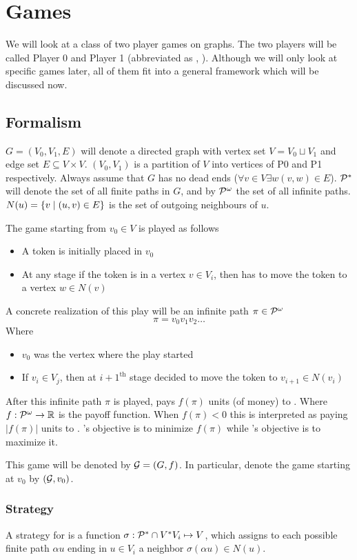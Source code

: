 \chapter{Games}
We will look at a class of two player games on graphs. The two players will be called Player 0 and Player 1 (abbreviated as , ). Although we will only look at specific games later, all of them fit into a general framework which will be discussed now.
\section{Formalism}
\label{sec:formalism}
$G=(V_0,V_1,E)$ will denote a directed graph with vertex set $V=V_0 \sqcup V_1$ and edge set $E \subseteq V\times V$. $(V_0,V_1)$ is a partition of $V$ into vertices of P0 and P1 respectively. Always assume that $G$ has no dead ends ($\forall v \in V \exists w  (v,w) \in E$). $\mathcal{P}^{*}$ will denote the set of all finite paths in $G$, and by $\mathcal{P}^\omega$ the set of all infinite paths. $N(u)=\left\{v \mid (u,v) \in E\right\}$ is the set of outgoing neighbours of $u$.

The game starting from $v_0 \in V$ is played as follows
\begin{itemize}
  \item A token is initially placed in $v_0$
  \item At any stage if the token is in a vertex $v \in V_i$, then  has to move the token to a vertex $w \in N(v)$
\end{itemize}
A concrete realization of this play will be an infinite path $\pi \in \mathcal{P}^\omega$
\[
  \pi = v_0 v_1 v_2 \ldots
\]
Where
\begin{itemize}
  \item $v_0$ was the vertex where the play started
  \item If $v_i \in V_j$, then at ${i+1}^\text{th}$ stage  decided to move the token to $v_{i+1} \in N(v_i)$
\end{itemize}
After this infinite path $\pi$ is played,  pays $f(\pi)$ units (of money) to . Where $f : \mathcal{P}^\omega \to \mathbb{R}
$ is the payoff function. When $f(\pi) < 0$ this is interpreted as  paying $|f(\pi)|$ units to . 's objective is to minimize $f(\pi)$ while 's objective is to maximize it.

This game will be denoted by $\mathcal{G}=(G,f)$. In particular, denote the game starting at $v_0$ by $(\mathcal{G},v_0)$.

\subsection{Strategy}
A strategy for  is a function $\sigma : \mathcal{P}^{*} \cap V^*V_{i} \mapsto V$, which assigns to each possible finite path $\alpha u$ ending in $ u \in V_i$ a neighbor $\sigma(\alpha u) \in N(u)$.

